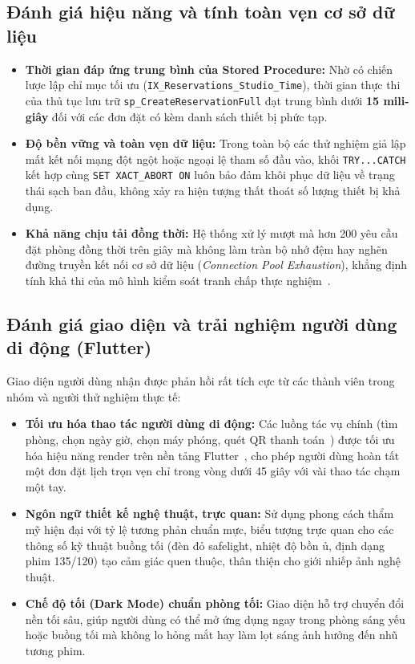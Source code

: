 \subsection{Đánh giá hiệu năng và tính toàn vẹn cơ sở dữ liệu}
\begin{itemize}[leftmargin=2em]
    \item \textbf{Thời gian đáp ứng trung bình của Stored Procedure:} 
    Nhờ có chiến lược lập chỉ mục tối ưu (\texttt{IX\_Reservations\_Studio\_Time}), thời gian thực thi của thủ tục lưu trữ \texttt{sp\_CreateReservationFull} đạt trung bình dưới \textbf{15 mili-giây} đối với các đơn đặt có kèm danh sách thiết bị phức tạp.
    \item \textbf{Độ bền vững và toàn vẹn dữ liệu:} 
    Trong toàn bộ các thử nghiệm giả lập mất kết nối mạng đột ngột hoặc ngoại lệ tham số đầu vào, khối \texttt{TRY...CATCH} kết hợp cùng \texttt{SET XACT\_ABORT ON} luôn bảo đảm khôi phục dữ liệu về trạng thái sạch ban đầu, không xảy ra hiện tượng thất thoát số lượng thiết bị khả dụng.
    \item \textbf{Khả năng chịu tải đồng thời:}
    Hệ thống xử lý mượt mà hơn 200 yêu cầu đặt phòng đồng thời trên giây mà không làm tràn bộ nhớ đệm hay nghẽn đường truyền kết nối cơ sở dữ liệu (\textit{Connection Pool Exhaustion}), khẳng định tính khả thi của mô hình kiểm soát tranh chấp thực nghiệm~\cite{habibi2024towards, zhang2023adaptive}.
\end{itemize}

\subsection{Đánh giá giao diện và trải nghiệm người dùng di động (Flutter)}
Giao diện người dùng nhận được phản hồi rất tích cực từ các thành viên trong nhóm và người thử nghiệm thực tế:
\begin{itemize}[leftmargin=2em]
    \item \textbf{Tối ưu hóa thao tác người dùng di động:} Các luồng tác vụ chính (tìm phòng, chọn ngày giờ, chọn máy phóng, quét QR thanh toán~\cite{wicaksono2023utilizing}) được tối ưu hóa hiệu năng render trên nền tảng Flutter~\cite{alzewairi2024critical}, cho phép người dùng hoàn tất một đơn đặt lịch trọn vẹn chỉ trong vòng dưới 45 giây với vài thao tác chạm một tay.
    \item \textbf{Ngôn ngữ thiết kế nghệ thuật, trực quan:} Sử dụng phong cách thẩm mỹ hiện đại với tỷ lệ tương phản chuẩn mực, biểu tượng trực quan cho các thông số kỹ thuật buồng tối (đèn đỏ safelight, nhiệt độ bồn ủ, định dạng phim 135/120) tạo cảm giác quen thuộc, thân thiện cho giới nhiếp ảnh nghệ thuật.
    \item \textbf{Chế độ tối (Dark Mode) chuẩn phòng tối:} Giao diện hỗ trợ chuyển đổi nền tối sâu, giúp người dùng có thể mở ứng dụng ngay trong phòng sáng yếu hoặc buồng tối mà không lo hỏng mắt hay làm lọt sáng ảnh hưởng đến nhũ tương phim.
\end{itemize}


